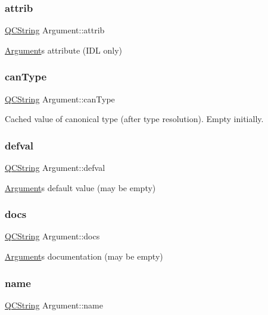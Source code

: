\subsubsection{\texorpdfstring{attrib}{attrib}}
{\footnotesize\ttfamily \mbox{\hyperlink{class_q_c_string}{Q\+C\+String}} Argument\+::attrib}

\mbox{\hyperlink{struct_argument}{Argument}}\textquotesingle{}s attribute (I\+DL only) \mbox{\label{struct_argument_ac20b3c80630f773cf72f13c6e44b235a}} 
\subsubsection{\texorpdfstring{canType}{canType}}
{\footnotesize\ttfamily \mbox{\hyperlink{class_q_c_string}{Q\+C\+String}} Argument\+::can\+Type}

Cached value of canonical type (after type resolution). Empty initially. \mbox{\label{struct_argument_a4fe1d9319dede52f7551f59297772efa}} 
\subsubsection{\texorpdfstring{defval}{defval}}
{\footnotesize\ttfamily \mbox{\hyperlink{class_q_c_string}{Q\+C\+String}} Argument\+::defval}

\mbox{\hyperlink{struct_argument}{Argument}}\textquotesingle{}s default value (may be empty) \mbox{\label{struct_argument_a5d6cd35aa392b1703acf14104b19c589}} 
\subsubsection{\texorpdfstring{docs}{docs}}
{\footnotesize\ttfamily \mbox{\hyperlink{class_q_c_string}{Q\+C\+String}} Argument\+::docs}

\mbox{\hyperlink{struct_argument}{Argument}}\textquotesingle{}s documentation (may be empty) \mbox{\label{struct_argument_a334668ce5d1f650c804e69f1bc941a3b}} 
\subsubsection{\texorpdfstring{name}{name}}
{\footnotesize\ttfamily \mbox{\hyperlink{class_q_c_string}{Q\+C\+String}} Argument\+::name}

